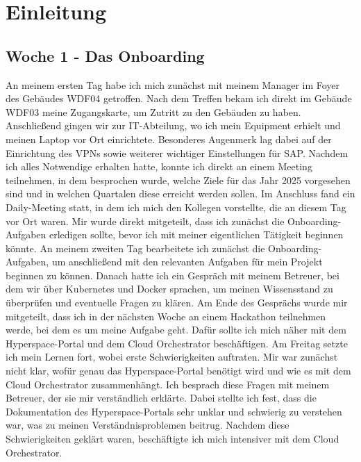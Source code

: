 \section{Einleitung}

\subsection{Woche 1 - Das Onboarding}
An meinem ersten Tag habe ich mich zunächst mit meinem Manager im Foyer des
Gebäudes WDF04 getroffen. Nach dem Treffen bekam ich direkt im Gebäude
WDF03 meine Zugangskarte, um Zutritt zu den Gebäuden zu haben. Anschließend
gingen wir zur IT-Abteilung, wo ich mein Equipment erhielt und meinen Laptop vor
Ort einrichtete. Besonderes Augenmerk lag dabei auf der Einrichtung des VPNs
sowie weiterer wichtiger Einstellungen für SAP.
Nachdem ich alles Notwendige erhalten hatte, konnte ich direkt an einem Meeting
teilnehmen, in dem besprochen wurde, welche Ziele für das Jahr 2025 vorgesehen
sind und in welchen Quartalen diese erreicht werden sollen. Im Anschluss fand ein
Daily-Meeting statt, in dem ich mich den Kollegen vorstellte, die an diesem Tag vor
Ort waren. Mir wurde direkt mitgeteilt, dass ich zunächst die Onboarding-Aufgaben
erledigen sollte, bevor ich mit meiner eigentlichen Tätigkeit beginnen könnte.
An meinem zweiten Tag bearbeitete ich zunächst die Onboarding-Aufgaben, um
anschließend mit den relevanten Aufgaben für mein Projekt beginnen zu können.
Danach hatte ich ein Gespräch mit meinem Betreuer, bei dem wir über Kubernetes
und Docker sprachen, um meinen Wissensstand zu überprüfen und eventuelle
Fragen zu klären. Am Ende des Gesprächs wurde mir mitgeteilt, dass ich in der
nächsten Woche an einem Hackathon teilnehmen werde, bei dem es um meine
Aufgabe geht. Dafür sollte ich mich näher mit dem Hyperspace-Portal und dem
Cloud Orchestrator beschäftigen.
Am Freitag setzte ich mein Lernen fort, wobei erste Schwierigkeiten auftraten. Mir
war zunächst nicht klar, wofür genau das Hyperspace-Portal benötigt wird und wie
es mit dem Cloud Orchestrator zusammenhängt. Ich besprach diese Fragen mit
meinem Betreuer, der sie mir verständlich erklärte. Dabei stellte ich fest, dass die
Dokumentation des Hyperspace-Portals sehr unklar und schwierig zu verstehen war,
was zu meinen Verständnisproblemen beitrug. Nachdem diese Schwierigkeiten
geklärt waren, beschäftigte ich mich intensiver mit dem Cloud Orchestrator.

